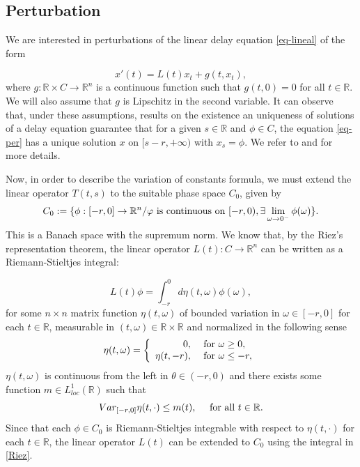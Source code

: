 \documentclass[9pt]{amsart}
\numberwithin{equation}{section}
\numberwithin{lemma}{section}
\begin{document}
\subsection{Perturbation}
We are interested in perturbations of the linear delay equation \eqref{eq-lineal} of the form

\begin{equation}\label{eq-per}
    x'(t) = L(t)x_t + g(t,x_t),
\end{equation}
where $g:\mathbb{R}\times C\to \mathbb{R}^n$ is a continuous function such that $g(t,0)=0$ for all $t\in\mathbb{R}$. We will also assume that $g$ is Lipschitz in the second variable. It can observe that, under these assumptions, results on the existence an uniqueness  of solutions of a delay equation guarantee that for a given $s\in\mathbb{R}$ and $\phi\in C$, the equation \eqref{eq-per} has a unique solution $x$ on $[s-r,+\infty)$ with $x_s=\phi.$ We refer to \cite{Hale} and \cite{Hale-Lunel} for more details.




Now, in order to describe the variation of constants formula, we must extend the linear operator $T(t,s)$ to the suitable phase space $C_0$, given by
$$C_0:=\{\phi:[-r,0]\to \mathbb{R}^n / \varphi \textnormal{ is continuous on } [-r,0), \exists \lim\limits_{\omega \to 0^{-}}\phi(\omega) \}.$$
This is a Banach space with the supremum norm. We know that, by the Riez's representation theorem, the linear operator $L(t):C\to\mathbb{R}^n$ can be written as a Riemann-Stieltjes integral:

\begin{equation}\label{Riez}
L(t)\phi = \int_{-r}^{0}d\eta(t,\omega)\phi(\omega),
\end{equation}
for some $n\times n$ matrix function $\eta(t,\omega)$ of bounded variation in $\omega\in[-r,0]$ for each $t\in\mathbb{R}$, measurable in $(t,\omega)\in\mathbb{R}\times\mathbb{R}$ and normalized in the following sense
$$\eta(t,\omega)=\left\{\begin{array}{rl}
    0, & \textnormal{ for } \omega\geq0,  \\
    \eta(t,-r), &  \textnormal{ for } \omega\leq -r,
\end{array}\right.$$
$\eta(t,\omega)$ is continuous from the left in $\theta\in(-r,0)$ and there exists some function $m\in L^1_{loc}(\mathbb{R})$ such that
$$Var_{[-r,0]}\eta(t,\cdot)\leq m(t), \quad \textnormal{ for all } t\in\mathbb{R}.$$
Since that each $\phi\in C_0$ is Riemann-Stieltjes integrable with respect to $\eta(t,\cdot)$ for each $t\in\mathbb{R}$, the linear operator $L(t)$ can be extended to $C_0$ using the integral in \eqref{Riez}. 
\end{document}
